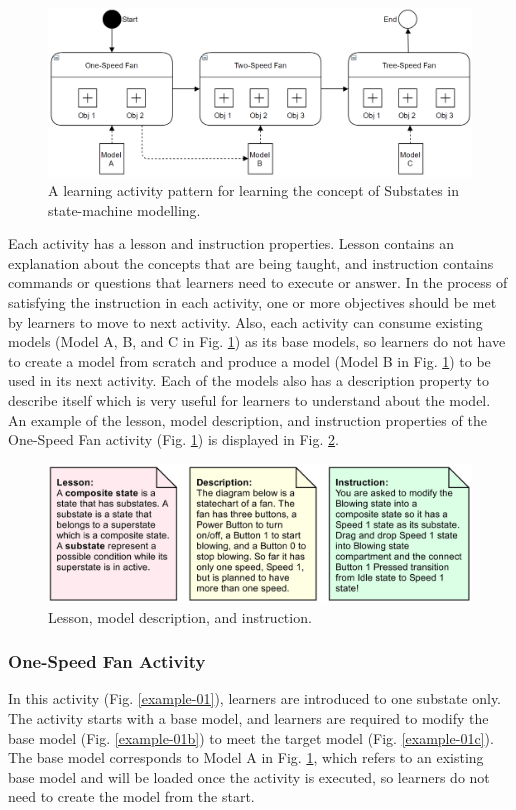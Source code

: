 \documentclass[conference]{IEEEtran}
\begin{document}
\begin{figure}[!t]
\centering
\includegraphics[width=\linewidth]{eoml}
\caption{A learning activity pattern for learning the concept of Substates in state-machine modelling.}
\label{eoml}
\end{figure}

Each activity has a lesson and instruction properties. Lesson contains an explanation about the concepts that are being taught, and instruction contains commands or questions that learners need to execute or answer. In the process of satisfying the instruction in each activity, one or more objectives should be met by learners to move to next activity. Also, each activity can consume existing models (Model A, B, and C in Fig. \ref{eoml}) as its base models, so learners do not have to create a model from scratch and produce a model (Model B in Fig. \ref{eoml}) to be used in its next activity. Each of the models also has a description property to describe itself which is very useful for learners to understand about the model. An example of the lesson, model description, and instruction properties of the One-Speed Fan activity (Fig. \ref{eoml}) is displayed in Fig. \ref{example-01a}.    

\begin{figure}[!t]
\centering
\includegraphics[width=\linewidth]{example-01a}
\caption{Lesson, model description, and instruction.}
\label{example-01a}
\end{figure}

\subsubsection{One-Speed Fan Activity}
In this activity (Fig. \ref{example-01}), learners are introduced to one substate only. The activity starts with a base model, and learners are required to modify the base model (Fig. \ref{example-01b}) to meet the target model (Fig. \ref{example-01c}). The base model corresponds to Model A in Fig. \ref{eoml}, which refers to an existing base model and will be loaded once the activity is executed, so learners do not need to create the model from the start. 
\end{document}
